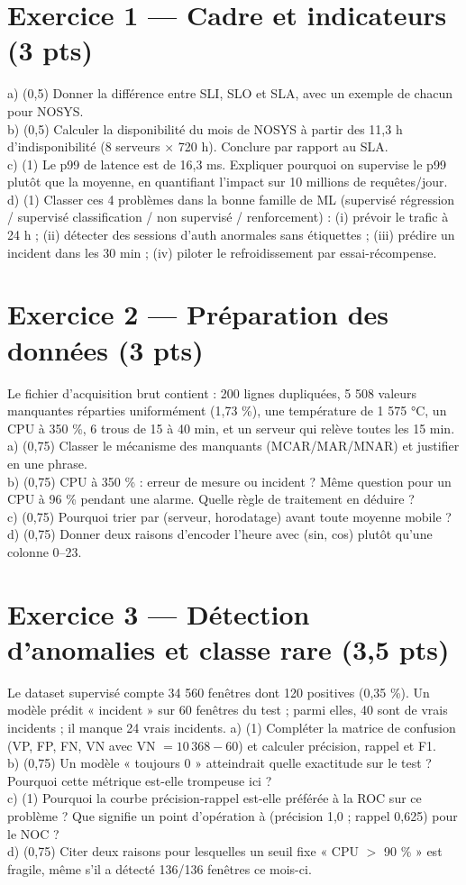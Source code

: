 \documentclass[11pt,a4paper]{article}
\begin{document}
\section*{Exercice 1 --- Cadre et indicateurs (3 pts)}
a) (0,5) Donner la différence entre SLI, SLO et SLA, avec un exemple de chacun pour NOSYS.\\
b) (0,5) Calculer la disponibilité du mois de NOSYS à partir des 11,3 h d'indisponibilité
(8 serveurs $\times$ 720 h). Conclure par rapport au SLA.\\
c) (1) Le p99 de latence est de 16,3 ms. Expliquer pourquoi on supervise le p99 plutôt
que la moyenne, en quantifiant l'impact sur 10 millions de requêtes/jour.\\
d) (1) Classer ces 4 problèmes dans la bonne famille de ML (supervisé régression /
supervisé classification / non supervisé / renforcement) :
(i) prévoir le trafic à 24 h ; (ii) détecter des sessions d'auth anormales sans
étiquettes ; (iii) prédire un incident dans les 30 min ; (iv) piloter le refroidissement
par essai-récompense.

\section*{Exercice 2 --- Préparation des données (3 pts)}
Le fichier d'acquisition brut contient : 200 lignes dupliquées, 5 508 valeurs manquantes
réparties uniformément (1,73 \%), une température de 1 575 °C, un CPU à 350 \%,
6 trous de 15 à 40 min, et un serveur qui relève toutes les 15 min.
a) (0,75) Classer le mécanisme des manquants (MCAR/MAR/MNAR) et justifier en une phrase.\\
b) (0,75) CPU à 350 \% : erreur de mesure ou incident ? Même question pour un CPU à 96 \%
pendant une alarme. Quelle règle de traitement en déduire ?\\
c) (0,75) Pourquoi trier par (serveur, horodatage) avant toute moyenne mobile ?\\
d) (0,75) Donner deux raisons d'encoder l'heure avec (sin, cos) plutôt qu'une colonne 0--23.

\section*{Exercice 3 --- Détection d'anomalies et classe rare (3,5 pts)}
Le dataset supervisé compte 34 560 fenêtres dont 120 positives (0,35 \%).
Un modèle prédit « incident » sur 60 fenêtres du test ; parmi elles, 40 sont de vrais
incidents ; il manque 24 vrais incidents.
a) (1) Compléter la matrice de confusion (VP, FP, FN, VN avec VN $= 10\,368 - 60$)
et calculer précision, rappel et F1.\\
b) (0,75) Un modèle « toujours 0 » atteindrait quelle exactitude sur le test ? Pourquoi
cette métrique est-elle trompeuse ici ?\\
c) (1) Pourquoi la courbe précision-rappel est-elle préférée à la ROC sur ce problème ?
Que signifie un point d'opération à (précision 1,0 ; rappel 0,625) pour le NOC ?\\
d) (0,75) Citer deux raisons pour lesquelles un seuil fixe « CPU $>$ 90 \% » est
fragile, même s'il a détecté 136/136 fenêtres ce mois-ci.
\end{document}
